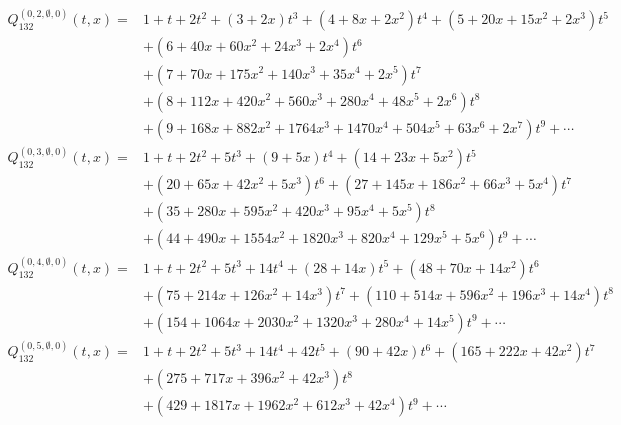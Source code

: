 \documentclass[
final,nomarks
]{dmtcs-episciences}
\newcommand{\Qmm}[1]{Q_{132}^{(#1)}(t,x)}
\begin{document}
\begin{align}
\Qmm{0,2,\emptyset,0}=&1+t+2 t^2+(3+2 x) t^3+\left(4+8 x+2 x^2\right) t^4+\left(5+20 x+15 x^2+2
x^3\right) t^5\nonumber\\\nonumber
&+\left(6+40 x+60 x^2+24 x^3+2 x^4\right) t^6\\\nonumber
&+\left(7+70 x+175
x^2+140 x^3+35 x^4+2 x^5\right) t^7\\\nonumber
&+\left(8+112 x+420 x^2+560 x^3+280 x^4+48
x^5+2 x^6\right) t^8\\
&+\left(9+168 x+882 x^2+1764 x^3+1470 x^4+504 x^5+63
x^6+2 x^7\right) t^9+\cdots
\\
\Qmm{0,3,\emptyset,0}=&1+t+2 t^2+5 t^3+(9+5 x) t^4+\left(14+23 x+5 x^2\right) t^5\nonumber\\\nonumber
&+\left(20+65 x+42
x^2+5 x^3\right) t^6+\left(27+145 x+186 x^2+66 x^3+5 x^4\right)t^7\\\nonumber
&+\left(35+280 x+595 x^2+420 x^3+95 x^4+5 x^5\right) t^8\\
&+\left(44+490
x+1554 x^2+1820 x^3+820 x^4+129 x^5+5 x^6\right) t^9+\cdots
\\
\Qmm{0,4,\emptyset,0}=&1+t+2 t^2+5 t^3+14 t^4+(28+14 x) t^5+\left(48+70 x+14 x^2\right)
t^6\nonumber\\\nonumber
&+\left(75+214 x+126 x^2+14 x^3\right) t^7+\left(110+514 x+596 x^2+196
x^3+14 x^4\right) t^8\\
&+\left(154+1064 x+2030 x^2+1320 x^3+280 x^4+14
x^5\right) t^9+\cdots
\\
\Qmm{0,5,\emptyset,0}=&1+t+2 t^2+5 t^3+14 t^4+42 t^5+(90+42 x) t^6+\left(165+222 x+42 x^2\right)
t^7\nonumber\\\nonumber
&+\left(275+717 x+396 x^2+42 x^3\right) t^8\\
&+\left(429+1817 x+1962 x^2+612
x^3+42 x^4\right) t^9+\cdots
\end{align}
\end{document}
